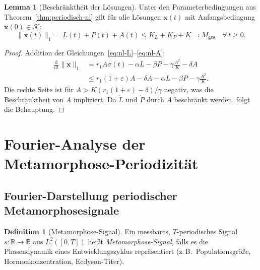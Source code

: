 ﻿\documentclass[12pt, a4paper]{article}
\theoremstyle{definition}
\newtheorem{lemma}[theorem]{Lemma}
\newtheorem{definition}[theorem]{Definition}
\newcommand{\R}{\mathbb{R}}
\newcommand{\dd}{\mathrm{d}}
\begin{document}
\begin{lemma}[Beschränktheit der Lösungen]\label{lem:beschraenkt}
Unter den Parameterbedingungen aus Theorem~\ref{thm:periodisch-nl} gilt für
alle Lösungen $\bm{x}(t)$ mit Anfangsbedingung $\bm{x}(0) \in \mathcal{K}$:
\[
  \|\bm{x}(t)\|_1 = L(t) + P(t) + A(t) \leq K_L + K_P + K \eqqcolon M_{\text{ges}}
  \quad \forall\, t \geq 0.
\]
\end{lemma}

\begin{proof}
Addition der Gleichungen~\eqref{eq:nl-L}--\eqref{eq:nl-A}:
\begin{align*}
  \frac{\dd}{\dd t}\|\bm{x}\|_1 &= r_1 A\sigma(t) - \alpha L - \beta P
  - \gamma\frac{A^2}{K} - \delta A \\
  &\leq r_1(1+\varepsilon) A - \delta A - \alpha L - \beta P
  - \gamma\frac{A^2}{K}.
\end{align*}
Die rechte Seite ist für $A > K(r_1(1+\varepsilon) - \delta)/\gamma$ negativ, was
die Beschränktheit von $A$ impliziert. Da $\dot{L}$ und $\dot{P}$ durch $A$
beschränkt werden, folgt die Behauptung. \hfill
\end{proof}

\section{Fourier-Analyse der Metamorphose-Periodizität}

\subsection{Fourier-Darstellung periodischer Metamorphosesignale}

\begin{definition}[Metamorphose-Signal]\label{def:signal}
Ein messbares, $T$-periodisches Signal $s: \R \to \R$ aus $L^2([0,T])$
heißt \emph{Metamorphose-Signal}, falls es die Phasendynamik eines
Entwicklungszyklus repräsentiert (z.\,B.\ Populationsgröße, Hormonkonzentration,
Ecdyson-Titer).
\end{definition}
\end{document}
